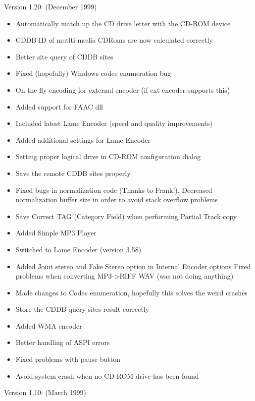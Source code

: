 Version 1.20: (December 1999)

\begin{itemize}
\itemsep=0pt
\item Automatically match up the CD drive letter with the CD-ROM device
\item CDDB ID of mutlti-media CDRoms are now calculated correctly
\item Better site query of CDDB sites
\item Fixed (hopefully) Windows codec enumeration bug
\item On the fly encoding for external encoder (if ext encoder supports this)
\item Added support for FAAC dll
\item Included latest Lame Encoder (speed and quality improvements)
\item Added additional settings for Lame Encoder
\item Setting proper logical drive in CD-ROM configuration dialog
\item Save the remote CDDB sites properly
\item Fixed bugs in normalization code (Thanks to Frank!). Decreased
normalization buffer size in order to avoid stack overflow problems
\item Save Correct TAG (Category Field) when performing Partial Track copy
\item Added Simple MP3 Player
\item Switched to Lame Encoder (version 3.58)
\item Added Joint stereo and Fake Stereo option in Internal Encoder options
Fixed problems when converting MP3->RIFF WAV (was not doing anything)
\item Made changes to Codec enumeration, hopefully this solves the weird
crashes
\item Store the CDDB query sites result correctly
\item Added WMA encoder
\item Better handling of ASPI errors
\item Fixed problems with pause button
\item Avoid system crash when no CD-ROM drive has been found
\end{itemize}

Version 1.10: (March 1999)

